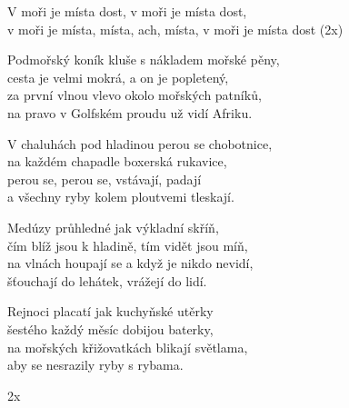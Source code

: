 
\cho{}
V moři je místa dost, v moři je místa dost,\\
v moři je místa, místa, ach, místa, v moři je místa dost (2x)

\ve{}
Podmořský koník kluše s nákladem mořské pěny,\\
cesta je velmi mokrá, a on je popletený,\\
za první vlnou vlevo okolo mořských patníků,\\
na pravo v Golfském proudu už vidí Afriku.

\cho{}

\ve{}
V chaluhách pod hladinou perou se chobotnice,\\
na každém chapadle boxerská rukavice,\\
perou se, perou se, vstávají, padají\\
a všechny ryby kolem ploutvemi tleskají.

\cho{}

\ve{}
Medúzy průhledné jak výkladní skříň,\\
čím blíž jsou k hladině, tím vidět jsou míň,\\
na vlnách houpají se a když je nikdo nevidí,\\
šťouchají do lehátek, vrážejí do lidí.

\cho{}

\ve{}
Rejnoci placatí jak kuchyňské utěrky\\
šestého každý měsíc dobijou baterky,\\
na mořských křižovatkách blikají světlama,\\
aby se nesrazily ryby s rybama.

\cho{} 2x

\esong